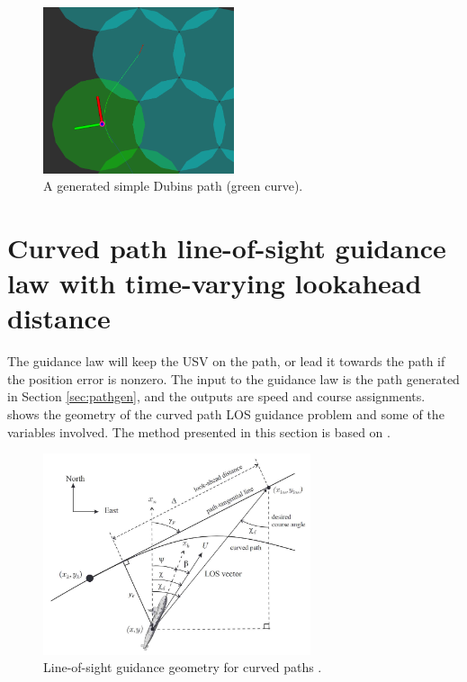 \begin{figure}[h!]
	\centering
	\includegraphics[width=0.5\textwidth]{fig/guidance/dubins-path}
	\caption{A generated simple Dubins path (green curve).}
	\label{fig:dubins_rviz}
\end{figure}



\section{Curved path line-of-sight guidance law with time-varying lookahead distance}

The guidance law will keep the USV on the path, or lead it towards the path if the position error is nonzero. The input to the guidance law is the path generated in Section \ref{sec:pathgen}, and the outputs are speed and course assignments.  shows the geometry of the curved path LOS guidance problem and some of the variables involved. The method presented in this section is based on \citet{lekkas2014integral}. 

\begin{figure}[h!]
	\centering
	\includegraphics[width=0.7\textwidth]{fig/guidance/curved-guidance.jpg}
	\caption[Line-of-sight guidance geometry for curved paths.]{Line-of-sight guidance geometry for curved paths \citep{lekkas2014integral}.}
	\label{fig:los-geometry}
\end{figure}

